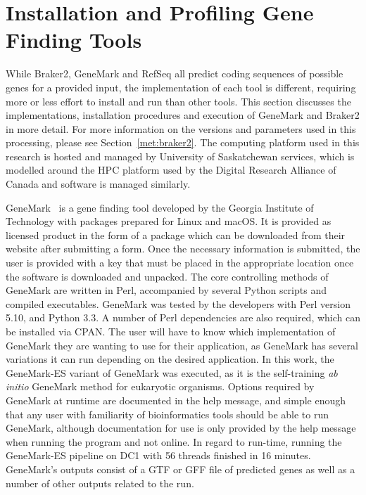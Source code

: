 \section{Installation and Profiling Gene Finding Tools}
\label{section:profiling}

While Braker2, GeneMark and RefSeq all predict coding sequences of
possible genes for a provided input, the implementation of each tool
is different, requiring more or less effort to install and run than
other tools. This section discusses the implementations, installation
procedures and execution of GeneMark and Braker2 in more detail. For
more information on the versions and parameters used in this
processing, please see Section~\ref{met:braker2}. The computing
platform used in this research is hosted and managed by University of
Saskatchewan services, which is modelled around the HPC platform used
by the Digital Research Alliance of Canada and software is managed
similarly.

GeneMark~\cite{borodovsky2011a} is a gene finding tool developed by
the Georgia Institute of Technology with packages prepared for Linux
and macOS. It is provided as licensed product in the form of a package
which can be downloaded from their website after submitting a
form. Once the necessary information is submitted, the user is
provided with a key that must be placed in the appropriate location
once the software is downloaded and unpacked. The core controlling
methods of GeneMark are written in Perl, accompanied by several Python
scripts and compiled executables. GeneMark was tested by the
developers with Perl version 5.10, and Python 3.3. A number of Perl
dependencies are also required, which can be installed via CPAN. The
user will have to know which implementation of GeneMark they are
wanting to use for their application, as GeneMark has several
variations it can run depending on the desired application. In this
work, the GeneMark-ES variant of GeneMark was executed, as it is the
self-training \textit{ab initio} GeneMark method for eukaryotic
organisms. Options required by GeneMark at runtime are documented in
the help message, and simple enough that any user with familiarity of
bioinformatics tools should be able to run GeneMark, although
documentation for use is only provided by the help message when
running the program and not online. In regard to run-time, running
the GeneMark-ES pipeline on DC1 with 56 threads finished in 16
minutes. GeneMark's outputs consist of a GTF or GFF file of predicted
genes as well as a number of other outputs related to the run.

